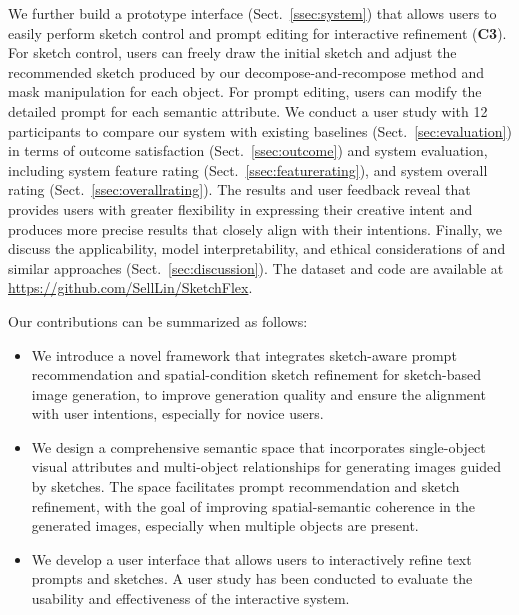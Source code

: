 We further build a prototype interface (Sect.~\ref{ssec:system}) that allows users to easily perform sketch control and prompt editing for interactive refinement (\textbf{C3}).
For sketch control, users can freely draw the initial sketch and adjust the recommended sketch produced by our decompose-and-recompose method and mask manipulation for each object.
For prompt editing, users can modify the detailed prompt for each semantic attribute.
We conduct a user study with 12 participants to compare our system with existing baselines (Sect.~\ref{sec:evaluation}) in terms of outcome satisfaction (Sect.~\ref{ssec:outcome}) and system evaluation, including system feature rating (Sect.~\ref{ssec:featurerating}), and system overall rating (Sect.~\ref{ssec:overallrating}). 
The results and user feedback reveal that \tool provides users with greater flexibility in expressing their creative intent and produces more precise results that closely align with their intentions. 
Finally, we discuss the applicability, model interpretability, and ethical considerations of \tool and similar approaches (Sect.~\ref{sec:discussion}).
The dataset and code are available at \url{https://github.com/SellLin/SketchFlex}.

Our contributions can be summarized as follows:
\begin{itemize}
    \item We introduce a novel framework that integrates sketch-aware prompt recommendation and spatial-condition sketch refinement for sketch-based image generation, to improve generation quality and ensure the alignment with user intentions, especially for novice users.
    
    \item We design a comprehensive semantic space that incorporates single-object visual attributes and multi-object relationships for generating images guided by sketches.
    The space facilitates prompt recommendation and sketch refinement, with the goal of improving spatial-semantic coherence in the generated images, especially when multiple objects are present.
    
    \item We develop a user interface that allows users to interactively refine text prompts and sketches. A user study has been conducted to evaluate the usability and effectiveness of the interactive system.
\end{itemize}

